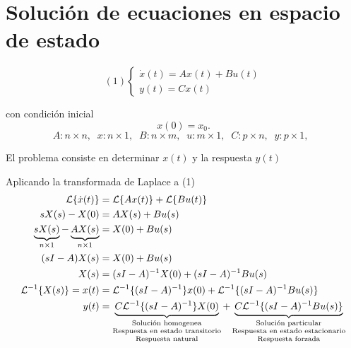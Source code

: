 \section{Solución de ecuaciones en espacio de estado}

\[
    (1)
    \left\{
        \begin{array}{lll}
            \dot{x}(t) = Ax(t) + Bu(t)\\
            y(t) = Cx(t)
        \end{array}
    \right.
\]

con condición inicial
\[ x(0) = x_{0}.\]
\[
A:n\times n,\;\; 
x:n\times 1,\;\;
B:n\times m,\;\;
u:m\times 1,\;\;
C:p\times n,\;\;
y:p\times 1,\;\;
\]

El problema consiste en determinar \(x(t)\) y la respuesta \(y(t)\)

Aplicando la transformada de Laplace a (1)
\[
\begin{split}
    \mathcal{L} \{ \dot{x}(t) \} & = \mathcal{L} \{ Ax(t) \} + \mathcal{L} \{ Bu(t) \} \\
    sX(s) - X(0) & = AX(s) + Bu(s)\\
    \underbrace{sX(s)}_{n\times1} - \underbrace{AX(s)}_{n\times1} & = X(0) + Bu(s)\\
    (sI-A)X(s) & = X(0) + Bu(s) \\
    X(s) & = (sI-A)^{-1}X(0) + (sI-A)^{-1}Bu(s) \\
    \mathcal{L}^{-1} \{ X(s) \} = x(t) & = \mathcal{L}^{-1} \{ (sI-A)^{-1} \} x(0) + \mathcal{L}^{-1} \{ (sI-A)^{-1}Bu(s) \} \\
    y(t) & = 
        \underbrace{C\mathcal{L}^{-1} \{ (sI-A)^{-1} \}X(0)}_
        {
        \begin{scriptsize}
            \begin{matrix}
                \text{Solución homogenea}\\
                \text{Respuesta en estado transitorio}\\
                \text{Respuesta natural}\\
            \end{matrix}
        \end{scriptsize}
        }+
        \underbrace{C\mathcal{L}^{-1} \{ (sI-A)^{-1}Bu(s) \}}_
        {
        \begin{scriptsize}
            \begin{matrix}
                \text{Solución particular}\\
                \text{Respuesta en estado estacionario}\\
                \text{Respuesta forzada}\\
            \end{matrix}
        \end{scriptsize}
        }
\end{split}
\]